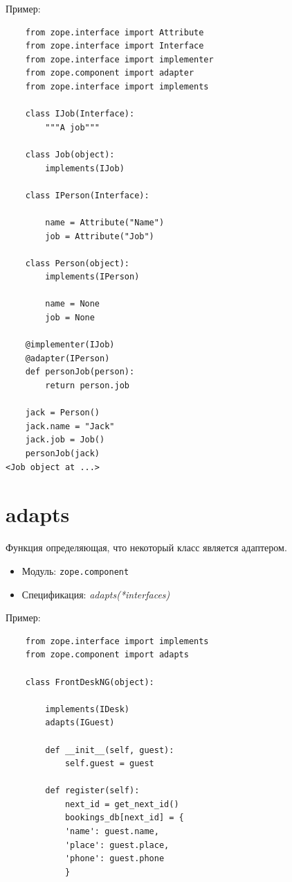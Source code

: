 \documentclass[a4paper,openany,twoside,final]{book}
\providecommand*{\DUroletitlereference}[1]{\textsl{#1}}
\begin{document}
Пример:

\begin{verbatim}
    from zope.interface import Attribute
    from zope.interface import Interface
    from zope.interface import implementer
    from zope.component import adapter
    from zope.interface import implements

    class IJob(Interface):
        """A job"""

    class Job(object):
        implements(IJob)

    class IPerson(Interface):

        name = Attribute("Name")
        job = Attribute("Job")

    class Person(object):
        implements(IPerson)

        name = None
        job = None

    @implementer(IJob)
    @adapter(IPerson)
    def personJob(person):
        return person.job

    jack = Person()
    jack.name = "Jack"
    jack.job = Job()
    personJob(jack)
<Job object at ...>
\end{verbatim}


\section*{adapts%
  \label{adapts}%
}

Функция определяющая, что некоторый класс является адаптером.

\begin{itemize}

\item Модуль: \texttt{zope.component}

\item Спецификация: \DUroletitlereference{adapts(*interfaces)}

\end{itemize}

Пример:

\begin{verbatim}
    from zope.interface import implements
    from zope.component import adapts

    class FrontDeskNG(object):

        implements(IDesk)
        adapts(IGuest)

        def __init__(self, guest):
            self.guest = guest

        def register(self):
            next_id = get_next_id()
            bookings_db[next_id] = {
            'name': guest.name,
            'place': guest.place,
            'phone': guest.phone
            }
\end{verbatim}
\end{document}
